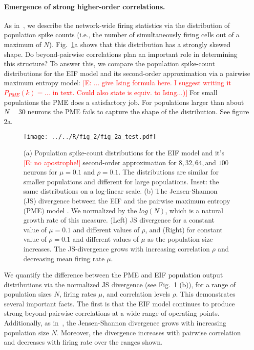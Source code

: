 \documentclass[%
 reprint,
 twocolumn,
 amsmath,amssymb,
 aps,
floatfix,
]{revtex4}
\newcommand{\Ecomment}[1]{\textcolor{red}{[E: #1]}}
\begin{document}
\paragraph*{Emergence of strong higher-order correlations.}  As in~\cite{Macke,Barreiro,Panzeri,Amarietal03}, we describe the network-wide firing statistics via the distribution of population spike counts (i.e., the number of simultaneously firing cells out of a maximum of $N$).  Fig.~\ref{fig:eifising}a shows that this distribution has a strongly skewed shape.  Do beyond-pairwise correlations plan an important role in determining this structure?  To answer this, we compare the population spike-count distributions for the EIF model and its second-order approximation via a pairwise maximum entropy model: \Ecomment{... give Ising formula here.  I suggest writing it $P_{PME}(k)=...$ in text.  Could also state is equiv. to Ising...)}  For small populations the PME does a satisfactory job. For populations larger than about $N=30$ neurons the PME fails to capture the shape of the distribution. 
See figure 2a.


\begin{figure}[h]
\texttt{[image: ../../R/fig\_2/fig\_2a\_test.pdf]}
\caption{\label{fig:eifising} %
(a) Population spike-count distributions for the EIF model and it's \Ecomment{no apostrophe!} second-order approximation for $8, 32, 64, \text{and } 100$ neurons for $\mu = 0.1$ and $\rho = 0.1$. The distributions are similar for smaller populations and different for large populations. Inset: the same distributions on a log-linear scale. (b) The Jensen-Shannon (JS) divergence between the EIF and the pairwise maximum entropy (PME) model .  We normalized by the $log(N)$, which is a natural growth rate of this measure. (Left) JS divergence for a constant value of $\mu = 0.1$ and different values of $\rho$, and (Right) for constant value of $\rho = 0.1$ and different values of $\mu$ as the population size increases. The JS-divergence grows with increasing correlation $\rho$ and decreasing mean firing rate $\mu$.}
\end{figure}

We quantify the difference between the PME and EIF population output distributions via the normalized JS divergence (see Fig.~\ref{fig:eifising} (b)), for a range of population sizes $N$, firing rates $\mu$, and correlation levels $\rho$.  This demonstrates several important facts.  The first is that the EIF model continues to produce strong beyond-pairwise correlations at a wide range of operating points.  Additionally, as in~\cite{Macke, cf. Roudi}, the Jensen-Shannon divergence grows with increasing population size $N$.  Moreover, the divergence increases with pairwise correlation and decreases with firing rate over the ranges shown.
\end{document}
